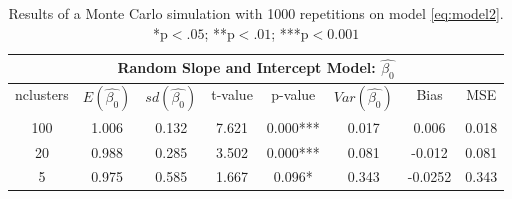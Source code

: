 \documentclass[a4paper,11pt]{article}
\begin{document}
\begin{table}[h!]
	\centering
	\begin{tabular}{||c c c c c c c c||} 
		\hline
		\multicolumn{8}{|c|}{Random Slope and Intercept Model: $\hat{\beta_0}$} \\
		
		\hline
		nclusters & $E(\hat{\beta_0})$ & $sd(\hat{\beta_0})$&t-value &p-value &$Var(\hat{\beta_0})$ & Bias & MSE \\ [0.5ex] 
		\hline
		100 &1.006&0.132&7.621&0.000*** &0.017&0.006& 0.018\\ 
		20 &0.988&0.285&3.502&0.000*** &0.081&-0.012&0.081 \\ 	
		5 &0.975&0.585&1.667&0.096* &0.343&-0.0252& 0.343\\ 
		[1ex] 
		\hline
	\end{tabular}
	\caption{Results of a Monte Carlo simulation with 1000 repetitions on model \ref{eq:model2}. *p$<.05$; **p$<.01$; ***p$<0.001$}
	\label{table:4}
\end{table}
		
\end{document}

